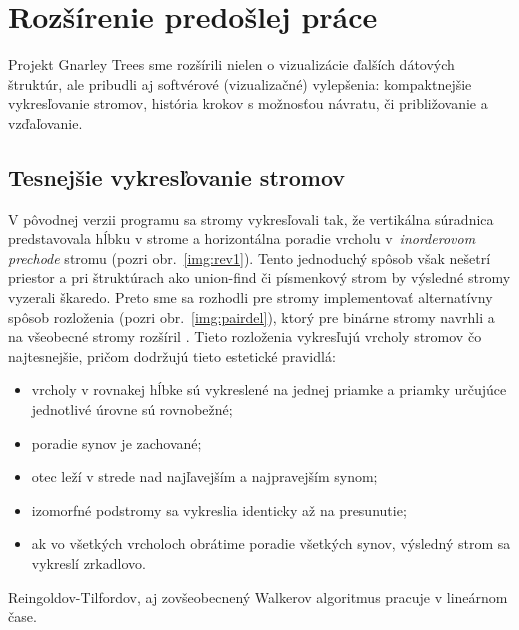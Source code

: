 \section{Rozšírenie predošlej práce}

Projekt Gnarley Trees sme rozšírili nielen o vizualizácie ďalších dátových
štruktúr, ale pribudli aj softvérové (vizualizačné) vylepšenia:
kompaktnejšie vykresľovanie stromov, história krokov s možnosťou návratu,
či približovanie a vzďaľovanie.

\subsection{Tesnejšie vykresľovanie stromov}

V pôvodnej verzii programu sa stromy vykresľovali tak, že vertikálna súradnica 
predstavovala hĺbku v strome a horizontálna poradie vrcholu v~\emph{inorderovom
prechode} stromu (pozri obr.~\ref{img:rev1}). Tento jednoduchý spôsob však nešetrí priestor
a pri štruktúrach ako union-find či písmenkový strom by výsledné stromy 
vyzerali škaredo. Preto sme sa rozhodli pre stromy implementovať 
alternatívny spôsob rozloženia (pozri obr.~\ref{img:pairdel}), ktorý pre binárne stromy navrhli \citet{reingold}
a na všeobecné stromy rozšíril \citet{walker}. Tieto rozloženia vykresľujú
vrcholy stromov čo najtesnejšie, pričom dodržujú tieto estetické pravidlá: 
\begin{itemize} 
\item vrcholy v rovnakej hĺbke sú vykreslené na jednej priamke a priamky 
určujúce jednotlivé úrovne sú rovnobežné; 
\item poradie synov je zachované; 
\item otec leží v strede nad najľavejším a najpravejším synom; 
\item izomorfné podstromy sa vykreslia identicky až na presunutie;
\item ak vo všetkých vrcholoch obrátime poradie všetkých synov, výsledný strom 
sa vykreslí zrkadlovo.
\end{itemize}
Reingoldov-Tilfordov, aj zovšeobecnený Walkerov algoritmus pracuje v lineárnom
čase.
